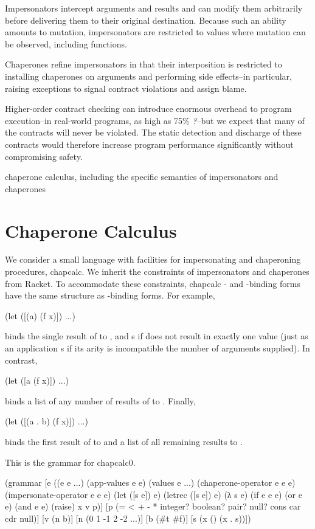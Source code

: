 \documentclass{sigplanconf}
\begin{document}
Impersonators intercept arguments and results and can modify them arbitrarily before delivering them to their original destination.
Because such an ability amounts to mutation, impersonators are restricted to values where mutation can be observed, including functions.

Chaperones refine impersonators in that their interposition is restricted to installing chaperones on arguments and performing side effects--in particular, raising exceptions to signal contract violations and assign blame.

Higher-order contract checking can introduce enormous overhead to program execution--in real-world programs, as high as 75\% \emph{?}--but we expect that many of the contracts will never be violated.
The static detection and discharge of these contracts would therefore increase program performance significantly without compromising safety.

chaperone calculus, including the specific semantics of impersonators and chaperones

\section{Chaperone Calculus}

We consider a small language with facilities for impersonating and chaperoning procedures, chapcalc.
We inherit the constraints of impersonators and chaperones from Racket.
To accommodate these constraints, chapcalc - and -binding forms have the same structure as -binding forms.
For example,
\begin{schemedisplay}
(let ([(a) (f x)])
  ...)
\end{schemedisplay}
binds the single result of  to , and s if  does not result in exactly one value (just as an application s if its arity is incompatible the number of arguments supplied).
In contrast,
\begin{schemedisplay}
(let ([a (f x)])
  ...)
\end{schemedisplay}
binds a list of any number of results of  to .
Finally,
\begin{schemedisplay}
(let ([(a . b) (f x)])
  ...)
\end{schemedisplay}
binds the first result of  to  and a list of all remaining results to .

This is the grammar for chapcalc0.
\begin{schemedisplay}
(grammar
  [e ((e e ...)
      (app-values e e)
      (values e ...)
      (chaperone-operator e e e)
      (impersonate-operator e e e)
      (let ([s e]) e)
      (letrec ([s e]) e)
      (λ s e)
      (if e e e)
      (or e e)
      (and e e)
      (raise)
      x
      v
      p)]
  [p (= < + - * integer? boolean? pair? null? cons car cdr null)]
  [v (n b)]
  [n (0 1 -1 2 -2 ...)]
  [b (#t #f)]
  [s (x () (x . s))])
\end{schemedisplay}
\end{document}
